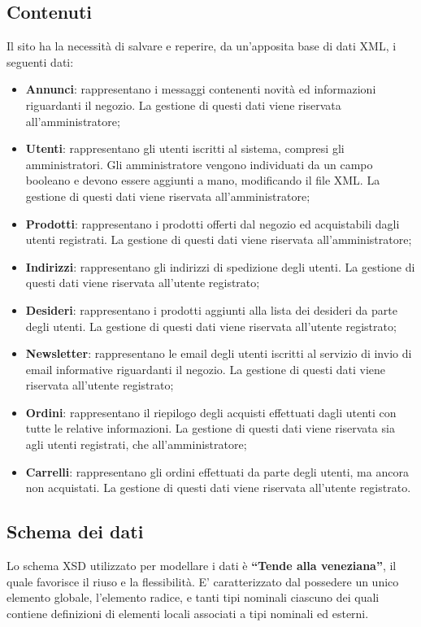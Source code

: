 	\subsection{Contenuti}
	Il sito ha la necessità di salvare e reperire, da un'apposita base di dati XML, i seguenti dati:
	\begin{itemize}
		\item \textbf{Annunci}: rappresentano i messaggi contenenti novità ed informazioni riguardanti il negozio. La gestione di questi dati viene riservata all'amministratore;
		\item \textbf{Utenti}: rappresentano gli utenti iscritti al sistema, compresi gli amministratori. Gli amministratore vengono individuati da un campo booleano e devono essere aggiunti a mano, modificando il file XML. La gestione di questi dati viene riservata all'amministratore;
		\item \textbf{Prodotti}: rappresentano i prodotti offerti dal negozio ed acquistabili dagli utenti registrati. La gestione di questi dati viene riservata all'amministratore;
		\item \textbf{Indirizzi}: rappresentano gli indirizzi di spedizione degli utenti. La gestione di questi dati viene riservata all'utente registrato;
		\item \textbf{Desideri}: rappresentano i prodotti aggiunti alla lista dei desideri da parte degli utenti. La gestione di questi dati viene riservata all'utente registrato;
		\item \textbf{Newsletter}: rappresentano le email degli utenti iscritti al servizio di invio di email informative riguardanti il negozio. La gestione di questi dati viene riservata all'utente registrato;
		\item \textbf{Ordini}: rappresentano il riepilogo degli acquisti effettuati dagli utenti con tutte le relative informazioni. La gestione di questi dati viene riservata sia agli utenti registrati, che all'amministratore;
		\item \textbf{Carrelli}: rappresentano gli ordini effettuati da parte degli utenti, ma ancora non acquistati. La gestione di questi dati viene riservata all'utente registrato.
	\end{itemize}
	
	\subsection{Schema dei dati}
	Lo schema XSD utilizzato per modellare i dati è \textbf{``Tende alla veneziana''}, il quale favorisce il riuso e la flessibilità. E' caratterizzato dal possedere un unico elemento globale, l'elemento radice, e tanti tipi nominali ciascuno dei quali contiene definizioni di elementi locali associati a tipi nominali ed esterni.
	
